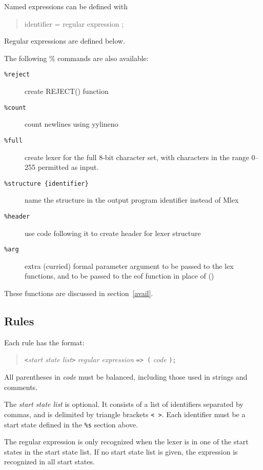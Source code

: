 \documentclass{article}
\begin{document}
Named expressions can be defined with

\begin{quote}
        {identifier} = {regular expression} ;
\end{quote}

Regular expressions are defined below.

The following \% commands are also available:

\begin{description}
\item[\tt \%reject]     create REJECT() function
\item[\tt \%count]      count newlines using yylineno
\item[\tt \%full]       create lexer for the full 8-bit character set,
                          with characters in the range 0--255 permitted
                          as input.
\item[\tt \%structure \{identifier\}]  name the structure in the output program
                          {identifier} instead of Mlex
\item[\tt \%header] 	use code following it to create header for lexer
			  structure
\item[\tt \%arg]       extra (curried) formal parameter argument to be
			  passed to the lex functions, and to be passed
			  to the eof function in place of ()
\end{description}
        These functions are discussed in section~\ref{avail}.

\subsection{Rules}

Each rule has the format:

\begin{quote}
       \verb|<|{\it start state list}\verb|>| {\it regular expression} \verb|=> (| {\it code} \verb|);|
\end{quote}

All parentheses in  {\it code}  must be balanced, including those
used in strings and comments.

The {\it start state list} is optional.  It consists of a list of
identifiers separated by commas, and is delimited by triangle
brackets \verb|< >|.  Each identifier must be a start state defined in the
\verb|%s| section above.

The regular expression is only recognized when the lexer is in one of
the start states in the start state list.  If no start state list is
given, the expression is recognized in all start states.
\end{document}
